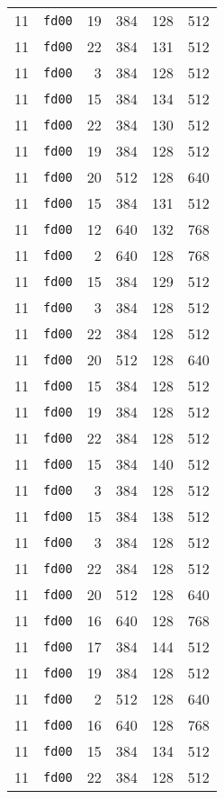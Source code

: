 \documentclass{article}
\begin{document}
\begin{table}[h!]
\begin{tabular}{llrrrl}
    11 & \texttt{fd00} & 19 & 384 & 128 & 512 \\
    11 & \texttt{fd00} & 22 & 384 & 131 & 512 \\
    11 & \texttt{fd00} & 3 & 384 & 128 & 512 \\
    11 & \texttt{fd00} & 15 & 384 & 134 & 512 \\
    11 & \texttt{fd00} & 22 & 384 & 130 & 512 \\
    11 & \texttt{fd00} & 19 & 384 & 128 & 512 \\
    11 & \texttt{fd00} & 20 & 512 & 128 & 640 \\
    11 & \texttt{fd00} & 15 & 384 & 131 & 512 \\
    11 & \texttt{fd00} & 12 & 640 & 132 & 768 \\
    11 & \texttt{fd00} & 2 & 640 & 128 & 768 \\
    11 & \texttt{fd00} & 15 & 384 & 129 & 512 \\
    11 & \texttt{fd00} & 3 & 384 & 128 & 512 \\
    11 & \texttt{fd00} & 22 & 384 & 128 & 512 \\
    11 & \texttt{fd00} & 20 & 512 & 128 & 640 \\
    11 & \texttt{fd00} & 15 & 384 & 128 & 512 \\
    11 & \texttt{fd00} & 19 & 384 & 128 & 512 \\
    11 & \texttt{fd00} & 22 & 384 & 128 & 512 \\
    11 & \texttt{fd00} & 15 & 384 & 140 & 512 \\
    11 & \texttt{fd00} & 3 & 384 & 128 & 512 \\
    11 & \texttt{fd00} & 15 & 384 & 138 & 512 \\
    11 & \texttt{fd00} & 3 & 384 & 128 & 512 \\
    11 & \texttt{fd00} & 22 & 384 & 128 & 512 \\
    11 & \texttt{fd00} & 20 & 512 & 128 & 640 \\
    11 & \texttt{fd00} & 16 & 640 & 128 & 768 \\
    11 & \texttt{fd00} & 17 & 384 & 144 & 512 \\
    11 & \texttt{fd00} & 19 & 384 & 128 & 512 \\
    11 & \texttt{fd00} & 2 & 512 & 128 & 640 \\
    11 & \texttt{fd00} & 16 & 640 & 128 & 768 \\
    11 & \texttt{fd00} & 15 & 384 & 134 & 512 \\
    11 & \texttt{fd00} & 22 & 384 & 128 & 512 \\

\end{tabular}
\end{table}
\end{document}

